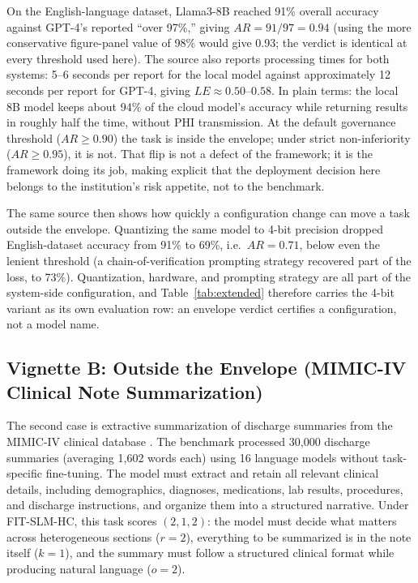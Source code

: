 \documentclass[11pt]{article}
\begin{document}
On the English-language dataset, Llama3-8B reached 91\% overall accuracy against GPT-4's reported ``over 97\%,'' giving $AR = 91/97 = 0.94$ (using the more conservative figure-panel value of 98\% would give 0.93; the verdict is identical at every threshold used here). The source also reports processing times for both systems: 5--6 seconds per report for the local model against approximately 12 seconds per report for GPT-4, giving $LE \approx 0.50$--$0.58$. In plain terms: the local 8B model keeps about 94\% of the cloud model's accuracy while returning results in roughly half the time, without PHI transmission. At the default governance threshold ($AR \geq 0.90$) the task is inside the envelope; under strict non-inferiority ($AR \geq 0.95$), it is not. That flip is not a defect of the framework; it is the framework doing its job, making explicit that the deployment decision here belongs to the institution's risk appetite, not to the benchmark.

The same source then shows how quickly a configuration change can move a task outside the envelope. Quantizing the same model to 4-bit precision dropped English-dataset accuracy from 91\% to 69\%, i.e.\ $AR = 0.71$, below even the lenient threshold (a chain-of-verification prompting strategy recovered part of the loss, to 73\%). Quantization, hardware, and prompting strategy are all part of the system-side configuration, and Table~\ref{tab:extended} therefore carries the 4-bit variant as its own evaluation row: an envelope verdict certifies a configuration, not a model name.

\subsection{Vignette B: Outside the Envelope (MIMIC-IV Clinical Note Summarization)}
\label{sec:vignette-b}

The second case is extractive summarization of discharge summaries from the MIMIC-IV clinical database \cite{Naemi2025}. The benchmark processed 30{,}000 discharge summaries (averaging 1{,}602 words each) using 16 language models without task-specific fine-tuning. The model must extract and retain all relevant clinical details, including demographics, diagnoses, medications, lab results, procedures, and discharge instructions, and organize them into a structured narrative. Under FIT-SLM-HC, this task scores $(2, 1, 2)$: the model must decide what matters across heterogeneous sections ($r=2$), everything to be summarized is in the note itself ($k=1$), and the summary must follow a structured clinical format while producing natural language ($o=2$).
\end{document}
